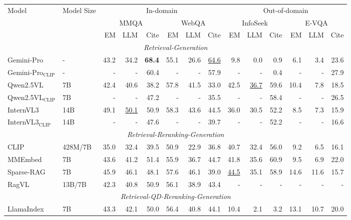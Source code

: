 \documentclass[letterpaper]{article} %
\begin{document}
\begin{table}[t]
    \small
    \centering
    \setlength{\tabcolsep}{7.6pt}

\begin{tabular}{@{}llrrrrrrrrrrrr@{}}
\toprule
\multirow{3}{*}{Model} & \multirow{3}{*}{Model Size} & \multicolumn{6}{c}{In-domain} & \multicolumn{6}{c}{Out-of-domain} \\
 &  & \multicolumn{3}{c}{MMQA}  & \multicolumn{3}{c}{WebQA} & \multicolumn{3}{c}{InfoSeek} & \multicolumn{3}{c}{E-VQA}\\ \cmidrule(l){3-14} 
 &  & EM & LLM & Cite & EM & LLM & Cite & EM & LLM & Cite & EM & LLM & Cite \\ 
\midrule
\multicolumn{14}{c}{\textit{Retrieval-Generation}} \\
\midrule
Gemini-Pro & - & 43.2 & 34.2 & \textbf{68.4} & 55.1 & 26.6 & \underline{64.6} & 9.8 & 0.0 & 0.9 & 6.1 & 3.4 & 23.6 \\
Gemini-Pro$_{\text{CLIP}}$ & - & - & - & 60.4 & - & - & 57.9 & - & - & 0.4 & - & - & 27.9 \\
\hdashline
Qwen2.5VL & 7B & 42.4 & 40.6 & 38.2 & 57.8 & 41.5 & 33.0 & 42.5 & \underline{36.7} & 59.6 & 10.4 & 7.8 & 18.5 \\
Qwen2.5VL$_{\text{CLIP}}$ & 7B & - & - & 47.2 & - & - & 35.5 & - & - & 58.4 & - & - & 26.5 \\
InternVL3 & 14B & 49.1 & \underline{50.1} & 50.9 & 58.3 & 43.6 & 44.5 & 36.0 & 30.5 & 52.2 & 8.5 & 7.3 & 15.9 \\
InternVL3$_{\text{CLIP}}$ & 14B & - & - & 47.6 & - & - & 39.7 & - & - & 52.2 & - & - & 16.6 \\
\midrule
\multicolumn{14}{c}{\textit{Retrieval-Reranking-Generation}} \\
\midrule
CLIP & 428M/7B & 35.0 & 32.4 & 39.5 & 50.9 & 22.9 & 36.8 & 40.7 & 32.4 & 56.0 & 9.2 & 6.5 & 16.1 \\
MMEmbed & 7B & 43.6 & 41.2 & 51.4 & 55.9 & 36.7 & 44.7 & 41.8 & 35.6 & 60.9 & 9.5 & 6.9 & 22.0 \\
Sparse-RAG & 7B & 45.9 & 46.1 & 48.1 & 57.6 & 46.1 & 39.0 & \underline{44.5} & 35.1 & 58.9 & 14.6 & 11.6 & 15.7 \\
RagVL & 13B/7B & 42.3 & 40.8 & 50.9 & 56.1 & 38.9 & 43.4 & - & - & - & - & - & - \\
\midrule
\multicolumn{14}{c}{\textit{Retrieval-QD-Reranking-Generation}} \\
\midrule
LlamaIndex & 7B & 43.3 & 42.1 & 50.0 & 56.4 & 40.8 & 44.1 & 10.4 & 2.1 & 3.2 & 13.1 & 10.7 & 20.0 \\

\end{tabular}
\end{table}
\end{document}
